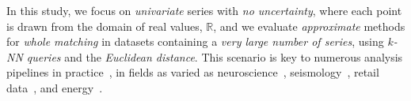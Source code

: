 In this study, we focus on \emph{univariate} series with \emph{no uncertainty}, where each point is drawn from the domain of real values, $\mathbb{R}$, and we evaluate \emph{approximate} methods for \emph{whole matching} in datasets containing a \emph{very large number of series}, using \emph{$k$-NN queries} and the \emph{Euclidean distance}. 
This scenario is key to numerous %
analysis pipelines in 
practice~\cite{journal/pattrecog/Warren2005,conf/kdd/Zoumpatianos2015,conf/sofsem/Palpanas2016,Palpanas2019}, in fields as varied as neuroscience~\cite{golay1998new}, seismology~\cite{kakizawa1998discrimination}, retail data~\cite{DBLP:conf/kdd/KumarPW02}, and energy~\cite{kovsmelj1990cross}. 




